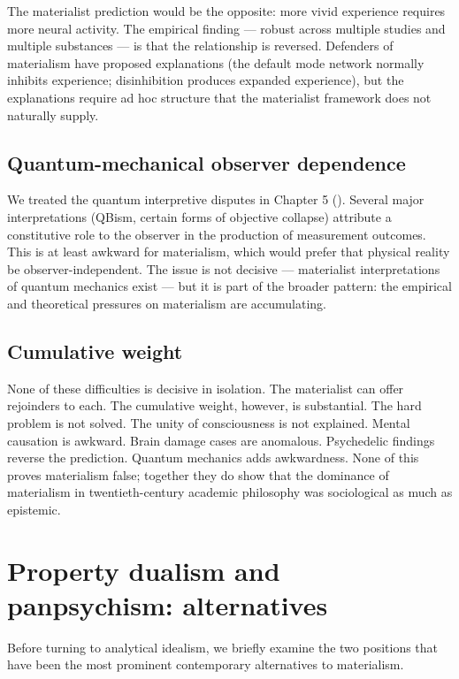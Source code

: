 The materialist prediction would be the opposite: more vivid
experience requires more neural activity. The empirical finding ---
robust across multiple studies and multiple substances --- is that
the relationship is reversed. Defenders of materialism have proposed
explanations (the default mode network normally inhibits experience;
disinhibition produces expanded experience), but the explanations
require ad hoc structure that the materialist framework does not
naturally supply.

\subsection{Quantum-mechanical observer dependence}

We treated the quantum interpretive disputes in Chapter 5
(). Several major interpretations
(QBism, certain forms of objective collapse) attribute a constitutive
role to the observer in the production of measurement outcomes.
This is at least awkward for materialism, which would prefer that
physical reality be observer-independent. The issue is not decisive
--- materialist interpretations of quantum mechanics exist --- but
it is part of the broader pattern: the empirical and theoretical
pressures on materialism are accumulating.

\subsection{Cumulative weight}

None of these difficulties is decisive in isolation. The
materialist can offer rejoinders to each. The cumulative weight,
however, is substantial. The hard problem is not solved. The unity
of consciousness is not explained. Mental causation is awkward.
Brain damage cases are anomalous. Psychedelic findings reverse the
prediction. Quantum mechanics adds awkwardness. None of this proves
materialism false; together they do show that the dominance of
materialism in twentieth-century academic philosophy was
sociological as much as epistemic.

\section{Property dualism and panpsychism: alternatives}
\label{sec:dualism-panpsychism}

Before turning to analytical idealism, we briefly examine the two
positions that have been the most prominent contemporary
alternatives to materialism.

